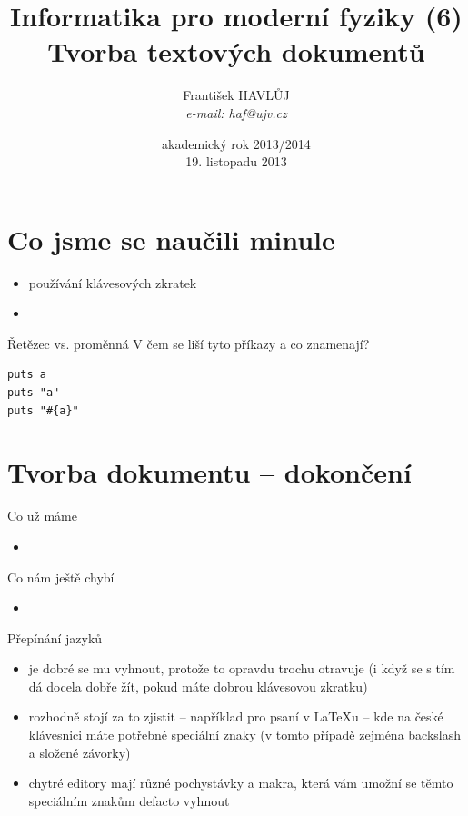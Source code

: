 \documentclass{beamer}
\title[IMF (6)]{Informatika pro moderní fyziky (6)\\ Tvorba textových dokumentů}
\author[Franti\v{s}ek HAVL\r{U}J, ORF ÚJV Řež]{Franti\v{s}ek HAVL\r{U}J\\{\scriptsize \emph{e-mail: haf@ujv.cz}}}
\date{akademický rok 2013/2014\\19. listopadu 2013}
\institute[ORF ÚJV Řež]
{ÚJV Řež\\oddělení Reaktorové fyziky a podpory palivového cyklu}
\begin{document}
\begin{frame}
  \titlepage
\end{frame}

\begin{frame}
  \tableofcontents
\end{frame}

\section{Co jsme se naučili minule}

\begin{frame}{}
  \begin{itemize}
    \item používání klávesových zkratek
    \item
  \end{itemize}
\end{frame}

\begin{frame}[fragile]{Řetězec vs. proměnná}
  V čem se liší tyto příkazy a co znamenají?
  \begin{verbatim}
puts a
puts "a"
puts "#{a}"
  \end{verbatim}
\end{frame}

\section{Tvorba dokumentu -- dokončení}

\begin{frame}{Co už máme}
  \begin{itemize}
    \item
  \end{itemize}
\end{frame}

\begin{frame}{Co nám ještě chybí}
  \begin{itemize}
    \item
  \end{itemize}
\end{frame}

\begin{frame}{Přepínání jazyků}
  \begin{itemize}
    \item je dobré se mu vyhnout, protože to opravdu trochu otravuje (i když se s tím dá docela dobře žít, pokud máte dobrou klávesovou zkratku)
    \item rozhodně stojí za to zjistit -- například pro psaní v LaTeXu -- kde na české klávesnici máte potřebné speciální znaky (v tomto případě zejména backslash a složené závorky)
    \item chytré editory mají různé pochystávky a makra, která vám umožní se těmto speciálním znakům defacto vyhnout
  \end{itemize}
\end{frame}
\end{document}
